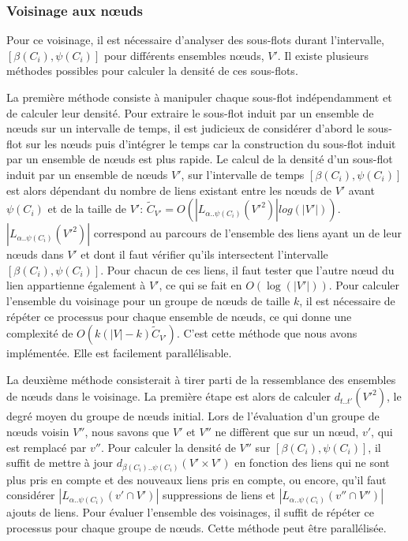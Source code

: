 \subsubsection{Voisinage aux n\oe{}uds}
Pour ce voisinage, il est nécessaire d'analyser des sous-flots durant l'intervalle, $[\beta(C_i),\psi(C_i)]$ pour différents ensembles n\oe{}uds, $V'$.
Il existe plusieurs méthodes possibles pour calculer la densité de ces sous-flots. 

La première méthode consiste à manipuler chaque sous-flot indépendamment et de calculer leur densité.
Pour extraire le sous-flot induit par un ensemble de n\oe{}uds sur un intervalle de temps,
il est judicieux de considérer d'abord le sous-flot sur les n\oe{}uds puis d'intégrer le temps car la construction du sous-flot induit par un ensemble de n\oe{}uds est plus rapide.
Le calcul de la densité d'un sous-flot induit par un ensemble de n\oe{}uds $V'$, sur l'intervalle de temps $[\beta(C_i),\psi(C_i)]$ est alors dépendant du nombre de liens existant entre les n\oe{}uds de $V'$ avant $\psi(C_i)$ et de la taille de $V'$: $\tilde{C}_{V'}=O(|L_{\alpha..\psi(C_i)}(V'^2)|log(|V'|))$.
$|L_{\alpha..\psi(C_i)}(V'^2)|$ correspond au parcours de l'ensemble des liens ayant un de leur n\oe{}uds dans $V'$ et dont il faut vérifier qu'ils intersectent l'intervalle $[\beta(C_i),\psi(C_i)]$.
Pour chacun de ces liens, il faut tester que l'autre n\oe{}ud du lien appartienne également à $V'$, ce qui se fait en $O(\log(|V'|))$.
Pour calculer l'ensemble du voisinage pour un groupe de n\oe{}uds de taille $k$, il est nécessaire de répéter ce processus pour chaque ensemble de n\oe{}uds, ce qui donne une complexité de $O(k(|V|-k) \tilde{C}_{V'})$.
C'est cette méthode que nous avons implémentée.
Elle est facilement parallélisable.

La deuxième méthode consisterait à tirer parti de la ressemblance des ensembles de n\oe{}uds dans le voisinage.
La première étape est alors de calculer $d_{t..t'}(V'^2)$, le degré moyen du groupe de n\oe{}uds initial.
Lors de l'évaluation d'un groupe de n\oe{}uds voisin $V''$, nous savons que $V'$ et $V''$ ne diffèrent que sur un n\oe{}ud, $v'$, qui est remplacé par $v''$.
Pour calculer la densité de $V''$ sur $[\beta(C_i),\psi(C_i)]$, il suffit de mettre à jour $d_{\beta(C_i)..\psi(C_i)}(V'\times V')$ en fonction des liens qui ne sont plus pris en compte et des nouveaux liens pris en compte, ou encore, qu'il faut considérer $|L_{\alpha..\psi(C_i)}({v'} \cap V')|$ suppressions de liens et $|L_{\alpha..\psi(C_i)}({v''} \cap V'')|$ ajouts de liens.
Pour évaluer l'ensemble des voisinages, il suffit de répéter ce processus pour chaque groupe de n\oe{}uds.
Cette méthode peut être parallélisée.


